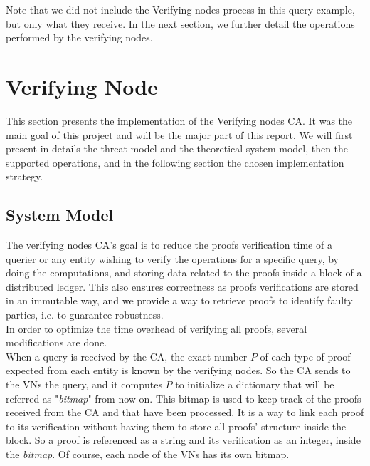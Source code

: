 \documentclass{article}
\begin{document}
Note that we did not include the Verifying nodes process in this query example, but only what they receive. In the next section, we further detail the operations performed by the verifying nodes.

\section{Verifying  Node}
This section presents the implementation of the Verifying nodes CA. It was the main goal of this project and will be the major part of this report. We will first present in details the threat model and the theoretical system model, then the supported operations, and in the following section the chosen implementation strategy.\\
\subsection{System Model}
The verifying nodes CA's goal is to reduce the proofs verification time of a querier or any entity wishing to verify the operations for a specific query, by doing the computations, and storing data related to the proofs inside a block of a distributed ledger. This also ensures correctness as proofs verifications are stored in an immutable way, and we provide a way to retrieve proofs to identify faulty parties, i.e. to guarantee robustness.\\
In order to optimize the time overhead of verifying all proofs, several modifications are done.\\

When a query is received by the CA,  the exact number $P$ of each type of proof expected from each entity is known by the verifying nodes. So the CA sends to the VNs the query, and it computes $P$ to initialize a dictionary that will be referred as "\textit{bitmap}" from now on. This bitmap is used to keep track of the proofs received from the CA and that have been processed. It is a way to link each proof to its verification without having them to store all proofs' structure inside the block. So a proof is referenced as a string and its verification as an integer, inside the \textit{bitmap}. Of course, each node of the VNs has its own bitmap.\\
\end{document}

